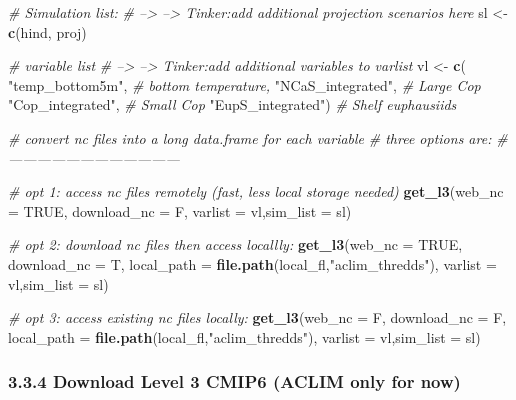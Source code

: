 \documentclass[
]{article}
\newenvironment{Shaded}{\begin{snugshade}}{\end{snugshade}}
\newcommand{\CommentTok}[1]{\textcolor[rgb]{0.56,0.35,0.01}{\textit{#1}}}
\newcommand{\DataTypeTok}[1]{\textcolor[rgb]{0.13,0.29,0.53}{#1}}
\newcommand{\KeywordTok}[1]{\textcolor[rgb]{0.13,0.29,0.53}{\textbf{#1}}}
\newcommand{\NormalTok}[1]{#1}
\newcommand{\OtherTok}[1]{\textcolor[rgb]{0.56,0.35,0.01}{#1}}
\newcommand{\StringTok}[1]{\textcolor[rgb]{0.31,0.60,0.02}{#1}}
\begin{document}
\begin{Shaded}
\begin{Highlighting}[]
    \CommentTok{# Simulation list:}
    \CommentTok{# --> --> Tinker:add additional projection scenarios here}
\NormalTok{    sl <-}\StringTok{ }\KeywordTok{c}\NormalTok{(hind, proj)}
    
    \CommentTok{# variable list}
    \CommentTok{# --> --> Tinker:add additional variables to varlist}
\NormalTok{    vl <-}\StringTok{ }\KeywordTok{c}\NormalTok{(}
              \StringTok{"temp_bottom5m"}\NormalTok{,    }\CommentTok{# bottom temperature,}
              \StringTok{"NCaS_integrated"}\NormalTok{,  }\CommentTok{# Large Cop}
              \StringTok{"Cop_integrated"}\NormalTok{,   }\CommentTok{# Small Cop}
              \StringTok{"EupS_integrated"}\NormalTok{)  }\CommentTok{# Shelf  euphausiids}
    
    \CommentTok{# convert  nc files into a long data.frame for each variable}
    \CommentTok{# three options are:}
    \CommentTok{# ------------------------------------}
    
    \CommentTok{# opt 1: access nc files remotely (fast, less local storage needed)}
    \KeywordTok{get_l3}\NormalTok{(}\DataTypeTok{web_nc =} \OtherTok{TRUE}\NormalTok{, }\DataTypeTok{download_nc =}\NormalTok{ F,}
          \DataTypeTok{varlist =}\NormalTok{ vl,}\DataTypeTok{sim_list =}\NormalTok{ sl)}
    
    \CommentTok{# opt 2:  download nc files then access locallly:}
    \KeywordTok{get_l3}\NormalTok{(}\DataTypeTok{web_nc =} \OtherTok{TRUE}\NormalTok{, }\DataTypeTok{download_nc =}\NormalTok{ T,}
          \DataTypeTok{local_path =} \KeywordTok{file.path}\NormalTok{(local_fl,}\StringTok{"aclim_thredds"}\NormalTok{),}
          \DataTypeTok{varlist =}\NormalTok{ vl,}\DataTypeTok{sim_list =}\NormalTok{ sl)}
    
     \CommentTok{# opt 3:  access existing nc files locally:}
    \KeywordTok{get_l3}\NormalTok{(}\DataTypeTok{web_nc =}\NormalTok{ F, }\DataTypeTok{download_nc =}\NormalTok{ F,}
          \DataTypeTok{local_path =} \KeywordTok{file.path}\NormalTok{(local_fl,}\StringTok{"aclim_thredds"}\NormalTok{),}
          \DataTypeTok{varlist =}\NormalTok{ vl,}\DataTypeTok{sim_list =}\NormalTok{ sl)}
\end{Highlighting}
\end{Shaded}

\hypertarget{download-level-3-cmip6-aclim-only-for-now}{%
\subsubsection{3.3.4 Download Level 3 CMIP6 (ACLIM only for
now)}\label{download-level-3-cmip6-aclim-only-for-now}}
\end{document}

